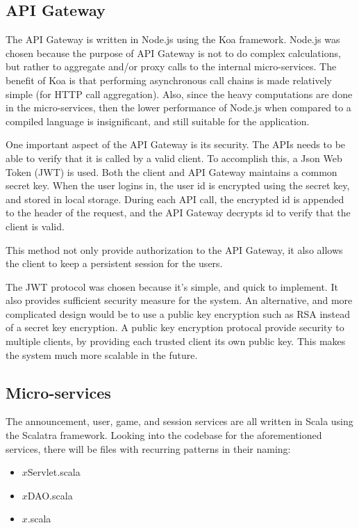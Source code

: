 \documentclass{article}
\begin{document}
\subsection{API Gateway}
The API Gateway is written in Node.js using the Koa framework. Node.js was chosen because the purpose of API Gateway is not to do complex calculations, but rather to aggregate and/or proxy calls to the internal micro-services. The benefit of Koa is that performing asynchronous call chains is made relatively simple (for HTTP call aggregation). Also, since the heavy computations are done in the micro-services, then the lower performance of Node.js when compared to a compiled language is insignificant, and still suitable for the application.

One important aspect of the API Gateway is its security. The APIs needs to be able to verify that it is called by a valid client. To accomplish this, a Json Web Token (JWT) is used. Both the client and API Gateway maintains a common secret key. When the user logins in, the user id is encrypted using the secret key, and stored in local storage. During each API call, the encrypted id is appended to the header of the request, and the API Gateway decrypts id to verify that the client is valid.

This method not only provide authorization to the API Gateway, it also allows the client to keep a persistent session for the users.

The JWT protocol was chosen because it's simple, and quick to implement. It also provides sufficient security measure for the system. An alternative, and more complicated design would be to use a public key encryption such as RSA instead of a secret key encryption. A public key encryption protocal provide security to multiple clients, by providing each trusted client its own public key. This makes the system much more scalable in the future.

\subsection{Micro-services}
The announcement, user, game, and session services are all written in Scala using the Scalatra framework. Looking into the codebase for the aforementioned services, there will be files with recurring patterns in their naming:

\begin{itemize}
  \item $x$Servlet.scala
  \item $x$DAO.scala
  \item $x$.scala
\end{itemize}
\end{document}
